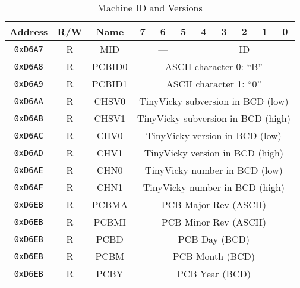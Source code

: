 \begin{table}[ht]
    \begin{center}
        \begin{tabular}{|c|c|c|c|c|c|c|c|c|c|c|} \hline
            Address & R/W & Name & 7 & 6 & 5 & 4 & 3 & 2 & 1 & 0 \\\hline\hline
            \verb+0xD6A7+ & R & MID & \multicolumn{3}{|c|}{---} & \multicolumn{5}{|c|}{ID} \\ \hline\hline

            \verb+0xD6A8+ & R & PCBID0 & \multicolumn{8}{|c|}{ASCII character 0: ``B''} \\ \hline
            \verb+0xD6A9+ & R & PCBID1 & \multicolumn{8}{|c|}{ASCII character 1: ``0''} \\ \hline
            \verb+0xD6AA+ & R & CHSV0 & \multicolumn{8}{|c|}{TinyVicky subversion in BCD (low)} \\ \hline
            \verb+0xD6AB+ & R & CHSV1 & \multicolumn{8}{|c|}{TinyVicky subversion in BCD (high)} \\ \hline
            \verb+0xD6AC+ & R & CHV0 & \multicolumn{8}{|c|}{TinyVicky version in BCD (low)} \\ \hline
            \verb+0xD6AD+ & R & CHV1 & \multicolumn{8}{|c|}{TinyVicky version in BCD (high)} \\ \hline
            \verb+0xD6AE+ & R & CHN0 & \multicolumn{8}{|c|}{TinyVicky number in BCD (low)} \\ \hline
            \verb+0xD6AF+ & R & CHN1 & \multicolumn{8}{|c|}{TinyVicky number in BCD (high)} \\ \hline\hline

            \verb+0xD6EB+ & R & PCBMA & \multicolumn{8}{|c|}{PCB Major Rev (ASCII)} \\ \hline
            \verb+0xD6EB+ & R & PCBMI & \multicolumn{8}{|c|}{PCB Minor Rev (ASCII)} \\ \hline
            \verb+0xD6EB+ & R & PCBD & \multicolumn{8}{|c|}{PCB Day (BCD)} \\ \hline
            \verb+0xD6EB+ & R & PCBM & \multicolumn{8}{|c|}{PCB Month (BCD)} \\ \hline
            \verb+0xD6EB+ & R & PCBY & \multicolumn{8}{|c|}{PCB Year (BCD)} \\ \hline
        \end{tabular}
    \end{center}
    \caption{Machine ID and Versions}
    \label{tab:machine_id_ver}
\end{table}


